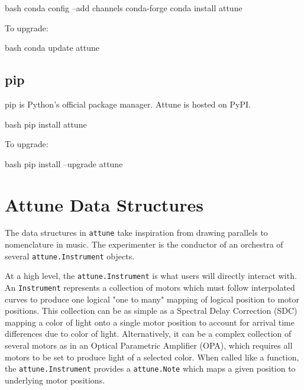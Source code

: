 \begin{codefragment}{bash}
conda config --add channels conda-forge
conda install attune
\end{codefragment}

To upgrade:

\begin{codefragment}{bash}
conda update attune
\end{codefragment}

\hypertarget{pip}{%
\subsection{pip}\label{pip}}

pip\cite{pip} is Python's official
package manager. Attune is
hosted on PyPI\cite{attune-pypi}.

\begin{codefragment}{bash}
pip install attune
\end{codefragment}

To upgrade:

\begin{codefragment}{bash}
pip install --upgrade attune
\end{codefragment}
\hypertarget{attune-data-structures}{%
\section{Attune Data Structures}\label{attune-data-structures}}

The data structures in \texttt{attune} take inspiration from drawing
parallels to nomenclature in music. The experimenter is the conductor of
an orchestra of several \texttt{attune.Instrument}
objects.

At a high level, the \texttt{attune.Instrument} is what
users will directly interact with. An
\texttt{Instrument} represents a collection of
motors which must follow interpolated curves to produce one logical "one
to many" mapping of logical position to motor positions. This collection
can be as simple as a Spectral Delay Correction (SDC) mapping a color of
light onto a single motor position to account for arrival time
differences due to color of light. Alternatively, it can be a complex
collection of several motors as in an Optical Parametric Amplifier
(OPA), which requires all motors to be set to produce light of a
selected color. When called like a function, the
\texttt{attune.Instrument} provides a
\texttt{attune.Note} which maps a given position to
underlying motor positions.

